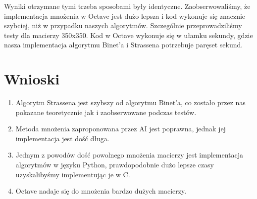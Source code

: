 \documentclass{article}
\begin{document}
\noindent
Wyniki otrzymane tymi trzeba sposobami były identyczne. Zaobserwowaliśmy, że implementacja mnożenia w Octave jest dużo lepsza i kod wykonuje się znacznie szybciej, niż w przypadku naszych algorytmów. Szczególnie przeprowadziliśmy testy dla macierzy 350x350. Kod w Octave wykonuje się w ułamku sekundy, gdzie nasza implementacja algorytmu Binet'a i Strassena potrzebuje paręset sekund.

\section{Wnioski}

\begin{enumerate}
    \item Algorytm Strassena jest szybszy od algorytmu Binet'a, co zostało przez nas pokazane teoretycznie jak i zaobserwowane podczas testów.
    \item Metoda mnożenia zaproponowana przez AI jest poprawna, jednak jej implementacja jest dość długa.
    \item Jednym z powodów dość powolnego mnożenia macierzy jest implementacja algorytmów w języku Python, prawdopodobnie dużo lepsze czasy uzyskalibyśmy implementując je w C.
    \item Octave nadaje się do mnożenia bardzo dużych macierzy.
\end{enumerate}
\end{document}
